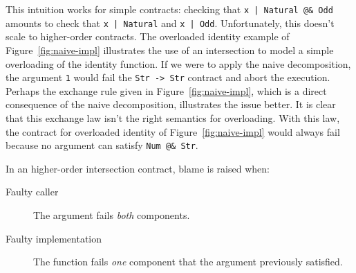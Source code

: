 \documentclass[sigplan,10pt,review,anonymous]{acmart}
\newcommand{\nickel}[1]{\lstinline[language=nickel]{#1}}
\begin{document}
This intuition works for simple contracts: checking that \nickel{x | Natural @&
Odd} amounts to check that \nickel{x | Natural} and \nickel{x | Odd}.
Unfortunately, this doesn't scale to higher-order contracts.  The overloaded
identity example of Figure~\ref{fig:naive-impl} illustrates the use of an
intersection to model a simple overloading of the identity function. If we were
to apply the naive decomposition, the argument \nickel{1} would fail the
\nickel{Str -> Str} contract and abort the execution. Perhaps the exchange rule
given in Figure~\ref{fig:naive-impl}, which is a direct consequence of the naive
decomposition, illustrates the issue better. It is clear that this exchange law
isn't the right semantics for overloading. With this law, the contract for
overloaded identity of Figure~\ref{fig:naive-impl} would always fail because
no argument can satisfy \nickel{Num @& Str}.


In an higher-order intersection contract, blame is raised when:
\begin{description}
    \item[Faulty caller] The argument fails \emph{both} components.
    \item[Faulty implementation] The function fails \emph{one} component that the
        argument previously satisfied.
\end{description}

\end{document}
